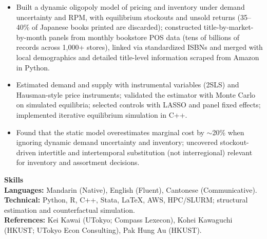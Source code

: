 ﻿\documentclass[11pt,letterpaper]{article}
\begin{document}
\begin{itemize}
  \item Built a dynamic oligopoly model of pricing and inventory under demand uncertainty and RPM, with equilibrium stockouts and unsold returns (35--40\% of Japanese books printed are discarded); constructed title-by-market-by-month panels from monthly bookstore POS data (tens of billions of records across 1{,}000+ stores), linked via standardized ISBNs and merged with local demographics and detailed title-level information scraped from Amazon in Python.
  \item Estimated demand and supply with instrumental variables (2SLS) and Hausman-style price instruments; validated the estimator with Monte Carlo on simulated equilibria; selected controls with LASSO and panel fixed effects; implemented iterative equilibrium simulation in C++.
  \item Found that the static model overestimates marginal cost by $\sim$20\% when ignoring dynamic demand uncertainty and inventory; uncovered stockout-driven intertitle and intertemporal substitution (not interregional) relevant for inventory and assortment decisions.
\end{itemize}

\vspace{16pt}

{\large \textbf{Skills}}\\[-0.5pt]
\textbf{Languages:} Mandarin (Native), English (Fluent), Cantonese (Communicative).\\
\textbf{Technical:} Python, R, C++, Stata, \LaTeX, AWS, HPC/SLURM; structural estimation and counterfactual simulation.\\
\textbf{References:} Kei Kawai (UTokyo; Compass Lexecon), Kohei Kawaguchi (HKUST; UTokyo Econ Consulting), Pak Hung Au (HKUST).
\end{document}
